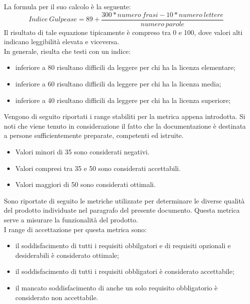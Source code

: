 					La formula per il suo calcolo è la seguente:
					\begin{equation}
						\label{eq:gulpease}
						Indice\ Gulpease = 89 + \frac{300*numero\ frasi-10*numero\ lettere}{numero\ parole}
					\end{equation}
					Il risultato di tale equazione tipicamente è compreso tra 0 e 100, dove valori alti indicano leggibilità elevata e viceversa.\\
					In generale, risulta che testi con un indice:
					\begin{itemize}
						\item inferiore a 80 risultano difficili da leggere per chi ha la licenza elementare;
						\item inferiore a 60 risultano difficili da leggere per chi ha la licenza media;
						\item inferiore a 40 risultano difficili da leggere per chi ha la licenza superiore;
					\end{itemize}
					Vengono di seguito riportati i range stabiliti per la metrica appena introdotta. Si noti che viene tenuto in considerazione il fatto 
					che la documentazione è destinata a persone sufficientemente preparate, competenti ed istruite.
					\begin{itemize}
						\item Valori minori di 35 sono considerati negativi.
						\item Valori compresi tra 35 e 50 sono considerati accettabili.
						\item Valori maggiori di 50 sono considerati ottimali.
					\end{itemize}
			Sono riportate di seguito le metriche utilizzate per determinare le diverse qualità del prodotto individuate nel paragrafo  del presente documento.
					Questa metrica serve a misurare la funzionalità del prodotto. \\
					I range di accettazione per questa metrica sono:
					\begin{itemize}
					\item il soddisfacimento di tutti i requisiti obbilgatori e di requisiti opzionali e desiderabili è considerato ottimale;
					\item il soddisfacimento di tutti i requisiti obbligatori è considerato accettabile;
					\item il mancato soddisfacimento di anche un solo requisito obbligatorio è considerato non accettabile.
					\end{itemize}
